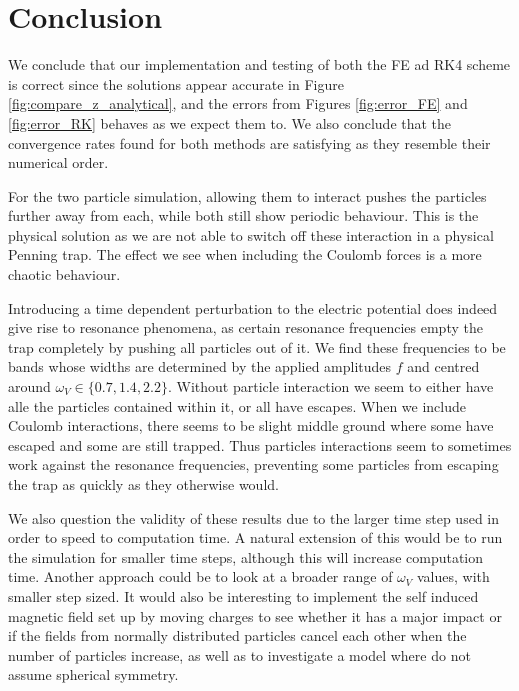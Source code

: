 \section{Conclusion}\label{sec:conclusion}

We conclude that our implementation and testing of both the FE ad RK4 scheme is correct since the solutions appear accurate in Figure \ref{fig:compare_z_analytical}, and the errors from Figures \ref{fig:error_FE} and \ref{fig:error_RK} behaves as we expect them to. We also conclude that the convergence rates found for both methods are satisfying as they resemble their numerical order. 


For the two particle simulation, allowing them to interact pushes the particles further away from each, while both still show periodic behaviour. This is the physical solution as we are not able to switch off these interaction in a physical Penning trap. The effect we see when including the Coulomb forces is a more chaotic behaviour. 

Introducing a time dependent perturbation to the electric potential does indeed give rise to resonance phenomena, as certain resonance frequencies empty the trap completely by pushing all particles out of it. We find these frequencies to be bands whose widths are determined by the applied amplitudes $f$ and centred around $\omega_V\in\{0.7, 1.4, 2.2\}$. Without particle interaction we seem to either have alle the particles contained within it, or all have escapes. When we include Coulomb interactions, there seems to be slight middle ground where some have escaped and some are still trapped. Thus particles interactions seem to sometimes work against the resonance frequencies, preventing some particles from escaping the trap as quickly as they otherwise would. 

We also question the validity of these results due to the larger time step used in order to speed to computation time. A natural extension of this would be to run the simulation for smaller time steps, although this will increase computation time. Another approach could be to look at a broader range of $\omega_V$ values, with smaller step sized. It would also be interesting to implement the self induced magnetic field set up by moving charges to see whether it has a major impact or if the fields from normally distributed particles cancel each other when the number of particles increase, as well as to investigate a model where do not assume spherical symmetry. 

